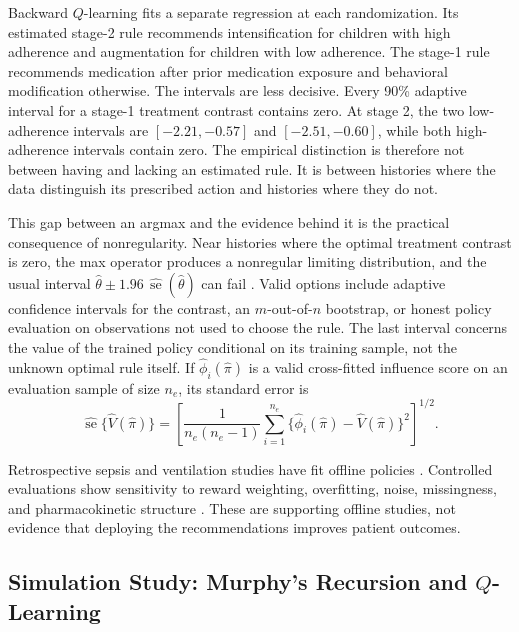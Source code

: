 Backward $Q$-learning fits a separate regression at each randomization. Its estimated stage-2 rule recommends intensification for children with high adherence and augmentation for children with low adherence. The stage-1 rule recommends medication after prior medication exposure and behavioral modification otherwise. The intervals are less decisive. Every 90\% adaptive interval for a stage-1 treatment contrast contains zero. At stage 2, the two low-adherence intervals are $[-2.21,-0.57]$ and $[-2.51,-0.60]$, while both high-adherence intervals contain zero. The empirical distinction is therefore not between having and lacking an estimated rule. It is between histories where the data distinguish its prescribed action and histories where they do not.

This gap between an argmax and the evidence behind it is the practical consequence of nonregularity. Near histories where the optimal treatment contrast is zero, the max operator produces a nonregular limiting distribution, and the usual interval $\hat\theta\pm1.96\,\widehat{\operatorname{se}}(\hat\theta)$ can fail \citep{laber2014dtrchallenges, wangtom2025dtrtutorial}. Valid options include adaptive confidence intervals for the contrast, an $m$-out-of-$n$ bootstrap, or honest policy evaluation on observations not used to choose the rule. The last interval concerns the value of the trained policy conditional on its training sample, not the unknown optimal rule itself. If $\hat\phi_i(\hat\pi)$ is a valid cross-fitted influence score on an evaluation sample of size $n_e$, its standard error is
\[
\widehat{\operatorname{se}}\{\hat V(\hat\pi)\}
=\left[
\frac{1}{n_e(n_e-1)}
\sum_{i=1}^{n_e}
\{\hat\phi_i(\hat\pi)-\hat V(\hat\pi)\}^2
\right]^{1/2}.
\]

Retrospective sepsis and ventilation studies have fit offline policies \citep{kaushik2022sepsiscql, kondrup2023deepvent}. Controlled evaluations show sensitivity to reward weighting, overfitting, noise, missingness, and pharmacokinetic structure \citep{roggeveen2024icmrl, luo2024dtrbench}. These are supporting offline studies, not evidence that deploying the recommendations improves patient outcomes.

\subsection{Simulation Study: Murphy's Recursion and $Q$-Learning}
\label{subsec:sim_dtr_recursion}

